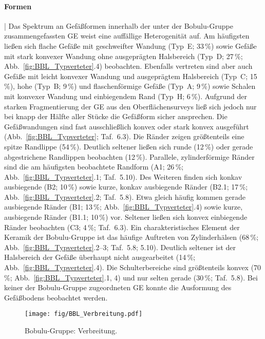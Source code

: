 \paragraph{Formen}\hspace{-.5em}|\hspace{.5em}%
Das Spektrum an Gefäßformen innerhalb der unter der Bobulu-Gruppe zusammengefassten GE weist eine auffällige Heterogenität auf. Am häufigsten ließen sich flache Gefäße mit geschweifter Wandung (Typ~E; 33\,\%) sowie Gefäße mit stark konvexer Wandung ohne ausgeprägten Halsbereich (Typ~D; 27\,\%; Abb.~\ref{fig:BBL_Typverteter}.4) beobachten. Ebenfalls vertreten sind aber auch Gefäße mit leicht konvexer Wandung und ausgeprägtem Halsbereich (Typ~C; 15\,\%), hohe (Typ~B; 9\,\%) und flaschenförmige Gefäße (Typ~A; 9\,\%) sowie Schalen mit konvexer Wandung und einbiegendem Rand (Typ~H; 6\,\%). Aufgrund der starken Fragmentierung der GE aus den Oberflächensurveys ließ sich jedoch nur bei knapp der Hälfte aller Stücke die Gefäßform sicher ansprechen. Die Gefäßwandungen sind fast ausschließlich konvex oder stark konvex ausgeführt (Abb.~\ref{fig:BBL_Typverteter}; Taf.~6.3). Die Ränder zeigen größtenteils eine spitze Randlippe (54\,\%). Deutlich seltener ließen sich runde (12\,\%) oder gerade abgestrichene Randlippen beobachten (12\,\%). Parallele, zylinderförmige Ränder sind die am häufigsten beobachtete Randform (A1; 26\,\%; Abb.~\ref{fig:BBL_Typverteter}.1; Taf.~5.10). Des Weiteren finden sich konkav ausbiegende (B2; 10\,\%) sowie kurze, konkav ausbiegende Ränder (B2.1; 17\,\%; Abb.~\ref{fig:BBL_Typverteter}.2; Taf.~5.8). Etwa gleich häufig kommen gerade ausbiegende Ränder (B1; 13\,\%; Abb.~\ref{fig:BBL_Typverteter}.4) sowie kurze, ausbiegende Ränder (B1.1; 10\,\%) vor. Seltener ließen sich konvex einbiegende Ränder beobachten (C3; 4\,\%; Taf.~6.3). Ein charakteristisches Element der Keramik der Bobulu-Gruppe ist das häufige Auftreten von Zylinderhälsen (68\,\%; Abb.~\ref{fig:BBL_Typverteter}.2--3; Taf.~5.8; 5.10). Deutlich seltener ist der Halsbereich der Gefäße überhaupt nicht ausgearbeitet (14\,\%; Abb.~\ref{fig:BBL_Typverteter}.4). Die Schulterbereiche sind größtenteils konvex (70\,\%; Abb.~\ref{fig:BBL_Typverteter}.1, 4) und nur selten gerade (30\,\%; Taf.~5.8). Bei keiner der Bobulu-Gruppe zugeordneten GE konnte die Ausformung des Gefäßbodens beobachtet werden.

\begin{figure*}[p]
	\centering
	\texttt{[image: fig/BBL\_Verbreitung.pdf]}
	\caption{Bobulu-Gruppe: Verbreitung.}
	\label{fig:BBL_Verbreitung}
\end{figure*}

